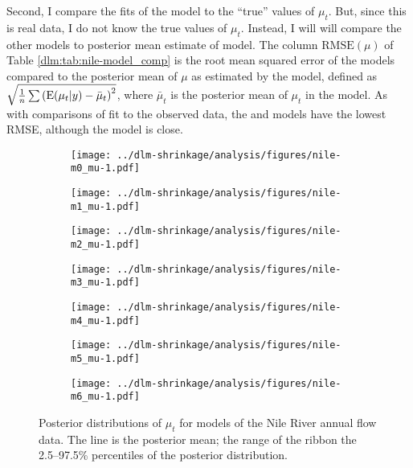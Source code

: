 Second, I compare the fits of the model to the ``true'' values of $\mu_{t}$. 
But, since this is real data, I do not know the true values of $\mu_{t}$.
Instead, I will will compare the other models to posterior mean estimate of  model. 
The column $\textrm{RMSE}(\mu)$ of Table \ref{dlm:tab:nile-model_comp} is the root mean squared error of the models compared to the posterior mean of $\mu$ as estimated by the  model, defined as $\sqrt{\frac{1}{n} \sum {(\operatorname{E}(\mu_{t}| y) - \bar{\mu}_{t})}^{2}}$, where $\bar{\mu}_{t}$ is the posterior mean of $\mu_{t}$ in the  model.
As with comparisons of fit to the observed data, the  and  models have the lowest RMSE, although the  model is close.


\begin{figure}[htpb!]
  \centering
  \begin{subfigure}[b]{0.5\linewidth}
    \texttt{[image: ../dlm-shrinkage/analysis/figures/nile-m0\_mu-1.pdf]}
    \caption{}
  \end{subfigure}%
  \begin{subfigure}[b]{0.5\linewidth}
    \texttt{[image: ../dlm-shrinkage/analysis/figures/nile-m1\_mu-1.pdf]}
    \caption{}
  \end{subfigure}
  \begin{subfigure}[b]{0.5\linewidth}
    \texttt{[image: ../dlm-shrinkage/analysis/figures/nile-m2\_mu-1.pdf]}    
    \caption{}
  \end{subfigure}%
  \begin{subfigure}[b]{0.5\linewidth}
    \texttt{[image: ../dlm-shrinkage/analysis/figures/nile-m3\_mu-1.pdf]}
    \caption{}
  \end{subfigure}
  \begin{subfigure}[b]{0.5\linewidth}
    \texttt{[image: ../dlm-shrinkage/analysis/figures/nile-m4\_mu-1.pdf]}    
    \caption{}
  \end{subfigure}%
  \begin{subfigure}[b]{0.5\linewidth}
    \texttt{[image: ../dlm-shrinkage/analysis/figures/nile-m5\_mu-1.pdf]}
    \caption{}
  \end{subfigure}
  \begin{subfigure}[b]{0.5\linewidth}
    \texttt{[image: ../dlm-shrinkage/analysis/figures/nile-m6\_mu-1.pdf]}    
    \caption{}
  \end{subfigure}
  \caption[Posterior distributions of $\mu_t$ for models of the Nile River annual flow data.]{Posterior distributions of $\mu_t$ for models of the Nile River annual flow data. The line is the posterior mean; the range of the ribbon the 2.5--97.5\% percentiles of the posterior distribution.}
  \label{dlm:fig:nile_mu_posterior}
\end{figure}


